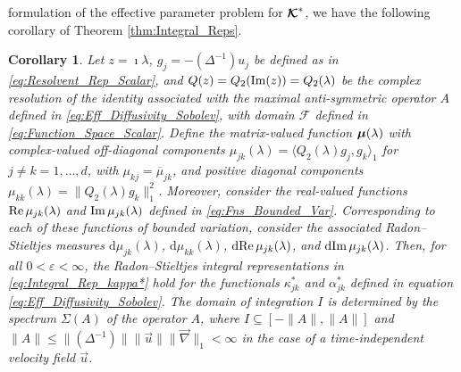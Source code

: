 \documentclass[11pt]{amsart}
\renewcommand{\d}{\mathrm{d}}
\newcommand\Kbc{\mbox{\boldmath${\mathcal{K}}$}}
\newcommand{\Fc}{\mathcal{F}}
\newcommand\bmu{\mbox{\boldmath${\mu}$}}
\newtheorem{corollary}{Corollary}[section]
\begin{document}
formulation of the effective parameter problem for $\Kbc^*$, we have
the following corollary of Theorem \ref{thm:Integral_Reps}.
%
\begin{corollary}\label{cor:Integral_Reps}
%
Let $z=\imath\lambda$, $g_j=-(\Delta^{-1})u_j$ be defined as in
\eqref{eq:Resolvent_Rep_Scalar}, and $Q(z)=Q_2({\rm Im}(z))=Q_2(\lambda)$ be
the complex resolution of the identity associated with the maximal
anti-symmetric operator $A$ defined in
\eqref{eq:Eff_Diffusivity_Sobolev}, with domain $\Fc$ defined in 
\eqref{eq:Function_Space_Scalar}.  Define the matrix-valued function
$\bmu(\lambda)$ with complex-valued off-diagonal components
$\mu_{jk}(\lambda)=\langle Q_2(\lambda)g_j,g_k\rangle_1$ for $j\neq k=1,\ldots,d$, with
$\mu_{kj}=\overline{\mu}_{jk}$, and positive diagonal components
$\mu_{kk}(\lambda)=\|Q_2(\lambda)g_k\|_1^2$.  Moreover, consider the real-valued
functions ${\rm Re}\,\mu_{jk}(\lambda)$ and ${\rm Im}\,\mu_{jk}(\lambda)$ defined in
\eqref{eq:Fns_Bounded_Var}. Corresponding to each of these functions
of bounded variation, consider the associated Radon--Stieltjes
measures $\d\mu_{jk}(\lambda)$, $\d\mu_{kk}(\lambda)$, $\d{\rm Re}\,\mu_{jk}(\lambda)$, and
$\d{\rm Im}\,\mu_{jk}(\lambda)$. Then, for all $0<\varepsilon<\infty$, the Radon--Stieltjes
integral representations in \eqref{eq:Integral_Rep_kappa*} hold for
the functionals $\kappa^*_{jk}$ and $\alpha^*_{jk}$ defined in equation
\eqref{eq:Eff_Diffusivity_Sobolev}. The domain of integration $I$ is
determined by the spectrum $\Sigma(A)$ of the operator $A$, where
$I\subseteq[-\|A\|,\|A\|]$ and $\|A\|\leq\|(\Delta^{-1})\|\|\vec{u}\|\|\vec{\nabla}\|_1<\infty$ in the case
of a time-independent velocity field $\vec{u}$.
% 
\end{corollary}
%
\end{document}
